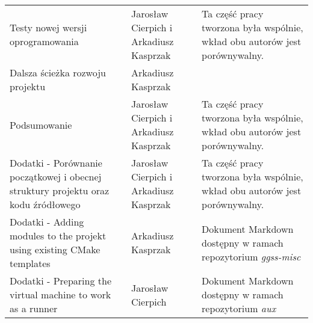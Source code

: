 \documentclass[12pt] {article}
\begin{document}
\begin{table}[!htb]
\centering
\begin{tabularx}{\textwidth}{@{}XXX@{}}

Testy nowej wersji oprogramowania & Jarosław Cierpich i Arkadiusz Kasprzak & Ta część pracy tworzona była wspólnie, wkład obu autorów jest porównywalny. \\
Dalsza ścieżka rozwoju projektu & Arkadiusz Kasprzak & \\
Podsumowanie & Jarosław Cierpich i Arkadiusz Kasprzak & Ta część pracy tworzona była wspólnie, wkład obu autorów jest porównywalny. \\
Dodatki - Porównanie początkowej i obecnej struktury projektu oraz kodu źródłowego & Jarosław Cierpich i Arkadiusz Kasprzak & Ta część pracy tworzona była wspólnie, wkład obu autorów jest porównywalny. \\
Dodatki - Adding modules to the projekt using existing CMake templates & Arkadiusz Kasprzak & Dokument Markdown dostępny w ramach repozytorium \textit{ggss-misc} \\
Dodatki - Preparing the virtual machine to work as a runner & Jarosław Cierpich & Dokument Markdown dostępny w ramach repozytorium \textit{aux} \\


\bottomrule
\end{tabularx}
\end{table}
\end{document}
